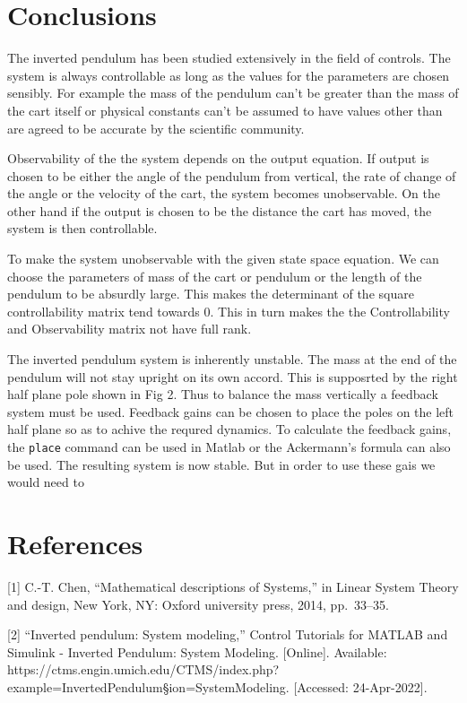 \documentclass[11pt]{article}
\begin{document}
\section{Conclusions}\label{conclusions}

The inverted pendulum has been studied extensively in the field of
controls. The system is always controllable as long as the values for
the parameters are chosen sensibly. For example the mass of the pendulum
can't be greater than the mass of the cart itself or physical constants
can't be assumed to have values other than are agreed to be accurate by
the scientific community.

Observability of the the system depends on the output equation. If
output is chosen to be either the angle of the pendulum from vertical,
the rate of change of the angle or the velocity of the cart, the system
becomes unobservable. On the other hand if the output is chosen to be
the distance the cart has moved, the system is then controllable.

To make the system unobservable with the given state space equation. We
can choose the parameters of mass of the cart or pendulum or the length
of the pendulum to be absurdly large. This makes the determinant of the
square controllability matrix tend towards 0. This in turn makes the the
Controllability and Observability matrix not have full rank.

The inverted pendulum system is inherently unstable. The mass at the end
of the pendulum will not stay upright on its own accord. This is
supposrted by the right half plane pole shown in Fig 2. Thus to balance
the mass vertically a feedback system must be used. Feedback gains can
be chosen to place the poles on the left half plane so as to achive the
requred dynamics. To calculate the feedback gains, the \texttt{place}
command can be used in Matlab or the Ackermann's formula can also be
used. The resulting system is now stable. But in order to use these gais
we would need to

\section{References}\label{references}

{[}1{]} C.-T. Chen, ``Mathematical descriptions of Systems,'' in Linear
System Theory and design, New York, NY: Oxford university press, 2014,
pp.~33--35.

{[}2{]} ``Inverted pendulum: System modeling,'' Control Tutorials for
MATLAB and Simulink - Inverted Pendulum: System Modeling. {[}Online{]}.
Available:
https://ctms.engin.umich.edu/CTMS/index.php?example=InvertedPendulum§ion=SystemModeling.
{[}Accessed: 24-Apr-2022{]}.


    
    
    
\end{document}
